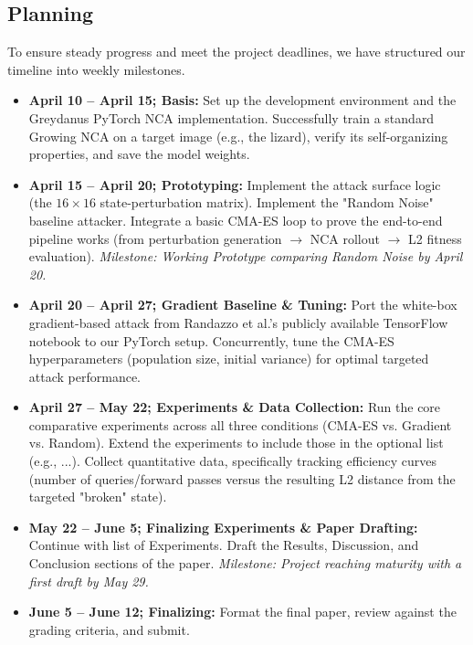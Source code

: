\documentclass{article}
\begin{document}
\subsection*{Planning}
To ensure steady progress and meet the project deadlines, we have structured our timeline into weekly milestones.
\begin{itemize}
	\item \textbf{April 10 -- April 15; Basis:} Set up the development environment and the Greydanus PyTorch NCA implementation. 
	Successfully train a standard Growing NCA on a target image (e.g., the lizard), verify its self-organizing properties, 
	and save the model weights.
	\item \textbf{April 15 -- April 20; Prototyping:} Implement the attack surface logic (the $16 \times 16$ state-perturbation matrix). 
	Implement the "Random Noise" baseline attacker. Integrate a basic CMA-ES loop to prove the end-to-end pipeline works (from 
	perturbation generation $\rightarrow$ NCA rollout $\rightarrow$ L2 fitness evaluation). 
	\subitem \textit{Milestone: Working Prototype comparing Random Noise by April 20.}
	\item \textbf{April 20 -- April 27; Gradient Baseline \& Tuning:} Port the white-box gradient-based attack from Randazzo et al.'s publicly available TensorFlow notebook to our PyTorch setup. Concurrently, tune the CMA-ES hyperparameters (population size,
	initial variance) for optimal targeted attack performance.
	\item \textbf{April 27 -- May 22; Experiments \& Data Collection:} Run the core comparative experiments across all three conditions 
	(CMA-ES vs. Gradient vs. Random). Extend the experiments to include those in the optional list (e.g., ...). 
	Collect quantitative data, specifically tracking efficiency curves (number of queries/forward passes versus the resulting L2 distance from the targeted "broken" state).
	\item \textbf{May 22 -- June 5; Finalizing Experiments \& Paper Drafting:} Continue with list of Experiments. Draft the Results, Discussion, and Conclusion sections of the paper. 
	\subitem \textit{Milestone: Project reaching maturity with a first draft by May 29.}
	\item \textbf{June 5 -- June 12; Finalizing:} Format the final paper, review against the grading criteria, and submit.
\end{itemize}
\end{document}
